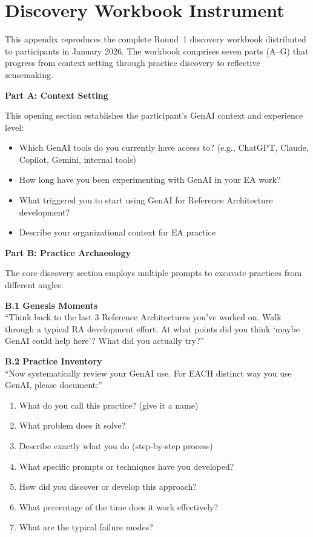 \section[Appendix - Discovery Workbook Instrument]{Discovery Workbook Instrument}\label{app:workbook}

This appendix reproduces the complete Round~1 discovery workbook distributed to
participants in January 2026. The workbook comprises seven parts (A--G) that
progress from context setting through practice discovery to reflective
sensemaking.

\textbf{Part A: Context Setting}

This opening section establishes the participant's GenAI context and experience
level:
\begin{itemize}
    \item Which GenAI tools do you currently have access to? (e.g., ChatGPT, Claude,
          Copilot, Gemini, internal tools)
    \item How long have you been experimenting with GenAI in your EA work?
    \item What triggered you to start using GenAI for Reference Architecture development?
    \item Describe your organizational context for EA practice
\end{itemize}

\textbf{Part B: Practice Archaeology}

The core discovery section employs multiple prompts to excavate practices from
different angles:

\textbf{B.1 Genesis Moments}\\
``Think back to the last 3 Reference Architectures you've worked on. Walk through a typical RA development effort.
At what points did you think `maybe GenAI could help here'? What did you actually try?''

\textbf{B.2 Practice Inventory}\\
``Now systematically review your GenAI use. For EACH distinct way you use GenAI, please document:''
\begin{enumerate}[label=B.2.\arabic*]
    \item What do you call this practice? (give it a name)
    \item What problem does it solve?
    \item Describe exactly what you do (step-by-step process)
    \item What specific prompts or techniques have you developed?
    \item How did you discover or develop this approach?
    \item What percentage of the time does it work effectively?
    \item What are the typical failure modes?
\end{enumerate}

